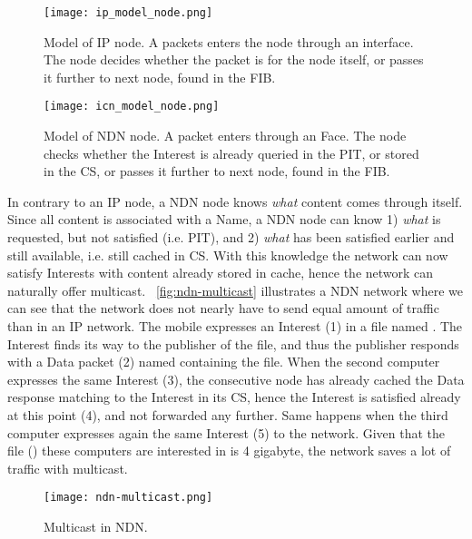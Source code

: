 \begin{figure}[H]
  \centering
  \texttt{[image: ip\_model\_node.png]}
  \caption{Model of IP node. A packets enters the node through an interface. 
  The node decides whether the packet is for the node itself, or passes it further to next node, found in the FIB.}
  \label{fig:ip-model-node}
\end{figure}

\begin{figure}[H]
  \centering
  \texttt{[image: icn\_model\_node.png]}
  \caption{Model of NDN node. A packet enters through an Face. 
  The node checks whether the Interest is already queried in the PIT, or stored in the CS, or passes it further to next node, found in the FIB.}
  \label{fig:icn-model-node}
\end{figure}

In contrary to an \gls{IP} node, a \gls{NDN} node knows \textit{what} content comes through itself. 
Since all content is associated with a Name, a \gls{NDN} node can know 1) \textit{what} is requested, but not satisfied (i.e. \gls{PIT}), and 2) \textit{what} has been satisfied earlier and still available, i.e. still cached in \gls{CS}.
With this knowledge the network can now satisfy Interests with content already stored in cache, hence the network can naturally offer multicast.
~\autoref{fig:ndn-multicast} illustrates a \gls{NDN} network where we can see that the network does not nearly have to send equal amount of traffic than in an \gls{IP} network.
The mobile expresses an Interest (1) in a file named .
The Interest finds its way to the publisher of the file, and thus the publisher responds with a Data packet (2) named  containing the file.
When the second computer expresses the same Interest (3), the consecutive node has already cached the Data response matching to the Interest in its \gls{CS}, hence the Interest is satisfied already at this point (4), and not forwarded any further.
Same happens when the third computer expresses again the same Interest (5) to the network.
Given that the file () these computers are interested in is 4 gigabyte, the network saves a lot of traffic with multicast.
\begin{figure}[H]
  \centering
  \texttt{[image: ndn-multicast.png]}
  \caption{Multicast in NDN.}
  \label{fig:ndn-multicast}
\end{figure}
 
